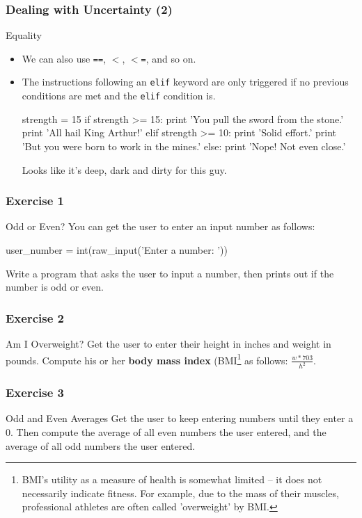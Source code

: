 \documentclass[10pt]{beamer}
\begin{document}
\begin{frame}[fragile]
  \frametitle{Dealing with Uncertainty (2)}
  \begin{block}{Equality}
    \begin{itemize}
      \item We can also use \texttt{==}, \texttt{$<$}, \texttt{$<$=}, and so on.
      \item The instructions following an \texttt{elif} keyword are only triggered if no previous conditions are met and the \texttt{elif} condition is.
        \begin{pythoncode}
  strength = 15
  if strength >= 15:
    print 'You pull the sword from the stone.'
    print 'All hail King Arthur!'
  elif strength >= 10:
    print 'Solid effort.'
    print 'But you were born to work in the mines.'
  else:
    print 'Nope! Not even close.'
        \end{pythoncode}
      Looks like it's deep, dark and dirty for this guy.
    \end{itemize}
  \end{block}
\end{frame}

\begin{frame}[fragile]
  \frametitle{Exercise 1}
  \begin{block}{Odd or Even?}
    You can get the user to enter an input number as follows:
    \begin{pythoncode}
  user_number = int(raw_input('Enter a number: '))
    \end{pythoncode}
    Write a program that asks the user to input a number, then prints out if the number is odd or even.
  \end{block}
\end{frame}
    
\begin{frame}
  \frametitle{Exercise 2}
  \begin{block}{Am I Overweight?}
    Get the user to enter their height in inches and weight in pounds.
    Compute his or her \textbf{body mass index} (BMI\footnote{BMI's utility as a measure of health is somewhat limited -- it does not necessarily indicate fitness. For example, due to the mass of their muscles, professional athletes are often called 'overweight' by BMI.} as follows: $\frac{w * 703}{h ^ 2}$.
  \end{block}
\end{frame}
    
\begin{frame}
  \frametitle{Exercise 3}
  \begin{block}{Odd and Even Averages}
    Get the user to keep entering numbers until they enter a 0.
    Then compute the average of all even numbers the user entered, and the average of all odd numbers the user entered.
  \end{block}
\end{frame}
    
\end{document}
